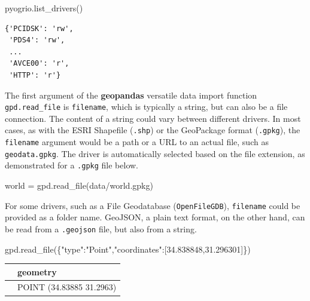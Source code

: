 \documentclass[
  letterpaper,
]{krantz}
\newenvironment{Shaded}{\begin{snugshade}}{\end{snugshade}}
\newcommand{\NormalTok}[1]{\textcolor[rgb]{0.00,0.23,0.31}{#1}}
\newcommand{\OperatorTok}[1]{\textcolor[rgb]{0.37,0.37,0.37}{#1}}
\newcommand{\StringTok}[1]{\textcolor[rgb]{0.13,0.47,0.30}{#1}}
\begin{document}
\begin{Shaded}
\begin{Highlighting}[]
\NormalTok{pyogrio.list\_drivers()}
\end{Highlighting}
\end{Shaded}

\begin{verbatim}
{'PCIDSK': 'rw',
 'PDS4': 'rw',
 ...
 'AVCE00': 'r',
 'HTTP': 'r'}
\end{verbatim}

The first argument of the \textbf{geopandas} versatile data import
function \texttt{gpd.read\_file} is \texttt{filename}, which is
typically a string, but can also be a file connection. The content of a
string could vary between different drivers. In most cases, as with the
ESRI Shapefile (\texttt{.shp}) or the GeoPackage format
(\texttt{.gpkg}), the \texttt{filename} argument would be a path or a
URL to an actual file, such as \texttt{geodata.gpkg}. The driver is
automatically selected based on the file extension, as demonstrated for
a \texttt{.gpkg} file below.

\begin{Shaded}
\begin{Highlighting}[]
\NormalTok{world }\OperatorTok{=}\NormalTok{ gpd.read\_file(}\StringTok{\textquotesingle{}data/world.gpkg\textquotesingle{}}\NormalTok{)}
\end{Highlighting}
\end{Shaded}

For some drivers, such as a File Geodatabase (\texttt{OpenFileGDB}),
\texttt{filename} could be provided as a folder name. GeoJSON, a plain
text format, on the other hand, can be read from a \texttt{.geojson}
file, but also from a string.

\begin{Shaded}
\begin{Highlighting}[]
\NormalTok{gpd.read\_file(}\StringTok{\textquotesingle{}\{"type":"Point","coordinates":[34.838848,31.296301]\}\textquotesingle{}}\NormalTok{)}
\end{Highlighting}
\end{Shaded}

\begin{longtable}[]{@{}ll@{}}
\toprule\noalign{}
& geometry \\
\midrule\noalign{}
\endhead
\bottomrule\noalign{}
\endlastfoot
0 & POINT (34.83885 31.2963) \\
\end{longtable}
\end{document}
